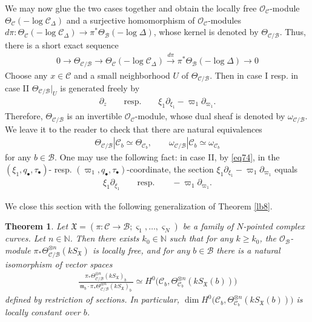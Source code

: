 \documentclass[12pt,b5paper,notitlepage]{report}
\theoremstyle{definition}
\theoremstyle{plain}
\newtheorem{thm}[df]{Theorem}
\newcommand{\fk}{\mathfrak}
\newcommand{\mc}{\mathcal}
\newcommand{\scr}{\mathscr}
\newcommand{\sgm}{\varsigma}
\newcommand{\SX}{S_{\fk X}}
\newcommand{\mbb}{\mathbb}
\newcommand{\blt}{\bullet}
\newcommand{\Nbb}{\mathbb N}
\numberwithin{equation}{section}
\begin{document}
We may now glue the two cases together and obtain the locally free $\scr O_{\mc C}$-module $\Theta_{\mc C}(-\log \mc C_\Delta)$  \index{zz@$\Theta_{\mc C}(-\log \mc C_\Delta)$} and a surjective  homomorphism of $\scr O_{\mc C}$-modules $d\pi:\Theta_{\mc C}(-\log \mc C_\Delta)\rightarrow\pi^*\Theta_{\mc B}(-\log\Delta)$, whose kernel is denoted by $\Theta_{\mc C/\mc B}$. \index{zz@$\Theta_{\mc C/\mc B}$} Thus, there is a short exact sequence
\begin{align}
\boxed{~~0\rightarrow \Theta_{\mc C/\mc B}\rightarrow \Theta_{\mc C}(-\log \mc C_\Delta)\xrightarrow{d\pi}\pi^*\Theta_{\mc B}(-\log \Delta)\rightarrow 0~~}\label{eq138}
\end{align}
Choose any $x\in\mc C$ and a small neighborhood $U$ of $\Theta_{\mc C/\mc B}$. Then in case I resp. in case II $\Theta_{\mc C/\mc B}|_U$ is generated freely by
\begin{align}
\partial_z\qquad\text{resp.}\qquad \xi_1\partial_{\xi_1}-\varpi_1\partial_{\varpi_1}.
\end{align}
Therefore, $\Theta_{\mc C/\mc B}$ is an invertible $\scr O_{\mc C}$-module, whose dual sheaf is denoted by $\omega_{\mc C/\mc B}$.\index{zz@$\omega_{\mc C/\mc B}$}    We leave it to the reader to check that there are natural equivalences
\begin{align*}
\Theta_{\mc C/\mc B}|\mc C_b\simeq \Theta_{\mc C_b},\qquad \omega_{\mc C/\mc B}|\mc C_b\simeq \omega_{\mc C_b}
\end{align*}
for any $b\in\mc B$. One may use the following fact:  in case II, by \eqref{eq74}, in the $(\xi_1,q_\blt,\tau_\blt)$- resp. $(\varpi_1,q_\blt,\tau_\blt)$-coordinate, the section $\xi_1\partial_{\xi_1}-\varpi_1\partial_{\varpi_1}$ equals
\begin{align}
\xi_1\partial_{\xi_1}\qquad\text{resp.}\qquad -\varpi_1\partial_{\varpi_1}.\label{eq80}
\end{align}

We close this section with the following generalization of Theorem \ref{lb8}.

\begin{thm}\label{lb9}
Let $\fk X=(\pi:\mc C\rightarrow\mc B;\sgm_1,\dots,\sgm_N)$ be a family of $N$-pointed complex curves. Let $n\in\Nbb$. Then  there exists $k_0\in\mbb N$ such that for any $k\geq k_0$,  the $\scr O_{\mc B}$-module  $\pi_*\Theta_{\mc C/\mc B}^{\otimes n}(k\SX)$ is locally free, and for any $b\in\mc B$ there is a natural isomorphism of vector spaces
\begin{align}
\frac{\pi_*\Theta_{\mc C/\mc B}^{\otimes n}(k\SX)_b}{~\fk m_b\cdot\pi_*\Theta_{\mc C/\mc B}^{\otimes n}(k\SX)_b~}\simeq H^0\big(\mc C_b,\Theta_{\mc C_b}^{\otimes n}(k\SX(b))\big)
\end{align} 
defined by  restriction of sections. In particular,  $\dim H^0\big(\mc C_b,\Theta_{\mc C_b}^{\otimes n}(k\SX(b))\big)$ is locally constant over $b$.
\end{thm}
\end{document}
